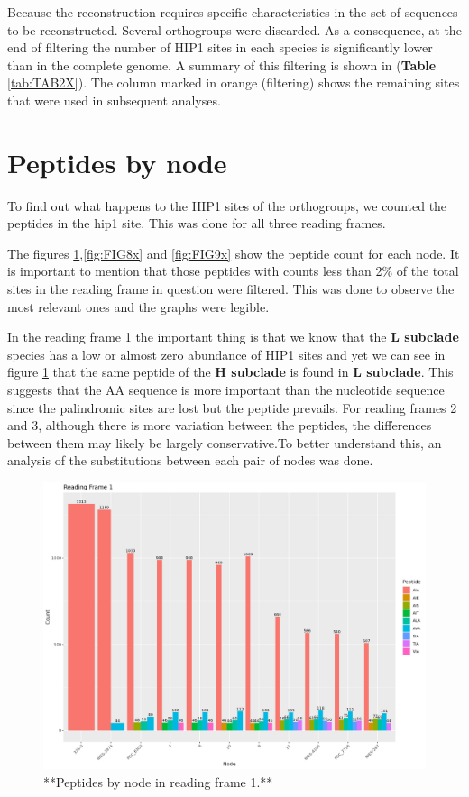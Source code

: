 \documentclass[
]{book}
\begin{document}
Because the reconstruction requires specific characteristics in the set of sequences to be reconstructed. Several orthogroups were discarded. As a consequence, at the end of filtering the number of HIP1 sites in each species is significantly lower than in the complete genome. A summary of this filtering is shown in (\textbf{Table} \ref{tab:TAB2X}). The column marked in orange (filtering) shows the remaining sites that were used in subsequent analyses.

\hypertarget{peptides-by-node-1}{%
\section{Peptides by node}\label{peptides-by-node-1}}

To find out what happens to the HIP1 sites of the orthogroups, we counted the peptides in the hip1 site. This was done for all three reading frames.

The figures \ref{fig:FIG7x},\ref{fig:FIG8x} and \ref{fig:FIG9x} show the peptide count for each node. It is important to mention that those peptides with counts less than 2\% of the total sites in the reading frame in question were filtered. This was done to observe the most relevant ones and the graphs were legible.

In the reading frame 1 the important thing is that we know that the \textbf{L subclade} species has a low or almost zero abundance of HIP1 sites and yet we can see in figure \ref{fig:FIG7x} that the same peptide of the \textbf{H subclade} is found in \textbf{L subclade}. This suggests that the AA sequence is more important than the nucleotide sequence since the palindromic sites are lost but the peptide prevails. For reading frames 2 and 3, although there is more variation between the peptides, the differences between them may likely be largely conservative.To better understand this, an analysis of the substitutions between each pair of nodes was done.

\begin{figure}
\includegraphics[width=1\linewidth]{figures/Peptides_RF1} \caption{**Peptides by node in reading frame 1.**}\label{fig:FIG7x}
\end{figure}
\end{document}
